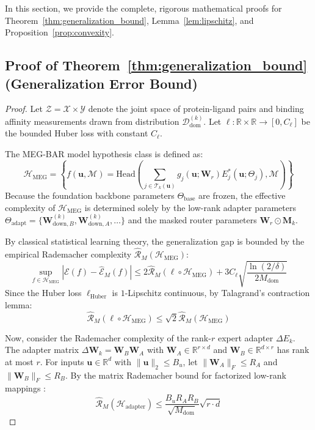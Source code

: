 \documentclass{article}
\theoremstyle{definition}
\begin{document}
In this section, we provide the complete, rigorous mathematical proofs for Theorem~\ref{thm:generalization_bound}, Lemma~\ref{lem:lipschitz}, and Proposition~\ref{prop:convexity}.

\subsection{Proof of Theorem~\ref{thm:generalization_bound} (Generalization Error Bound)}
\label{subsec:proof_thm1}

\begin{proof}
Let $\mathcal{Z} = \mathcal{X} \times \mathcal{Y}$ denote the joint space of protein-ligand pairs and binding affinity measurements drawn from distribution $\mathcal{D}_{\text{dom}}^{(k)}$. Let $\ell: \mathbb{R} \times \mathbb{R} \to [0, C_{\ell}]$ be the bounded Huber loss with constant $C_{\ell}$. 

The MEG-BAR model hypothesis class is defined as:
\begin{equation}
\mathcal{H}_{\text{MEG}} = \left\{ f(\mathbf{u}, \mathcal{M}) = \text{Head}\left( \sum_{j \in \mathcal{T}_k(\mathbf{u})} g_j(\mathbf{u}; \mathbf{W}_r) E_j^*(\mathbf{u}; \Theta_j), \mathcal{M} \right) \right\}
\end{equation}
Because the foundation backbone parameters $\Theta_{\text{base}}$ are frozen, the effective complexity of $\mathcal{H}_{\text{MEG}}$ is determined solely by the low-rank adapter parameters $\Theta_{\text{adapt}} = \{\mathbf{W}_{\text{down}, B}^{(k)}, \mathbf{W}_{\text{down}, A}^{(k)}, \dots\}$ and the masked router parameters $\mathbf{W}_r \odot \mathbf{M}_k$.

By classical statistical learning theory, the generalization gap is bounded by the empirical Rademacher complexity $\hat{\mathcal{R}}_M(\mathcal{H}_{\text{MEG}})$:
\begin{equation}
\sup_{f \in \mathcal{H}_{\text{MEG}}} | \mathcal{E}(f) - \hat{\mathcal{E}}_M(f) | \le 2 \hat{\mathcal{R}}_M(\ell \circ \mathcal{H}_{\text{MEG}}) + 3 C_{\ell} \sqrt{\frac{\ln(2/\delta)}{2 M_{\text{dom}}}}
\label{eq:rademacher_bound}
\end{equation}
Since the Huber loss $\ell_{\text{Huber}}$ is $1$-Lipschitz continuous, by Talagrand's contraction lemma:
\begin{equation}
\hat{\mathcal{R}}_M(\ell \circ \mathcal{H}_{\text{MEG}}) \le \sqrt{2} \hat{\mathcal{R}}_M(\mathcal{H}_{\text{MEG}})
\end{equation}

Now, consider the Rademacher complexity of the rank-$r$ expert adapter $\Delta E_k$. The adapter matrix $\Delta \mathbf{W}_k = \mathbf{W}_B \mathbf{W}_A$ with $\mathbf{W}_A \in \mathbb{R}^{r \times d}$ and $\mathbf{W}_B \in \mathbb{R}^{d \times r}$ has rank at most $r$. For inputs $\mathbf{u} \in \mathbb{R}^d$ with $\|\mathbf{u}\|_2 \le B_u$, let $\|\mathbf{W}_A\|_F \le R_A$ and $\|\mathbf{W}_B\|_F \le R_B$. By the matrix Rademacher bound for factorized low-rank mappings \citep{kakade2008duality}:
\begin{equation}
\hat{\mathcal{R}}_M(\mathcal{H}_{\text{adapter}}) \le \frac{B_u R_A R_B}{\sqrt{M_{\text{dom}}}} \sqrt{r \cdot d}
\end{equation}


\end{proof}
\end{document}
